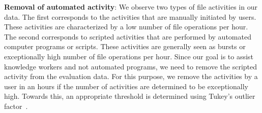 
\noindent\textbf{Removal of automated activity}: 
\label{sec:removebursts}
We observe two types of file activities in our data.  The first
corresponds to the activities that are manually initiated by
users. These activities are characterized by a low number of file
operations per hour.  The second corresponds to scripted activities
that are performed by automated computer programs or scripts.  These
activities are generally seen as bursts or exceptionally high number
of file operations per hour.  Since our goal is to assist knowledge
workers and not automated programs, we need to remove the scripted
activity from the evaluation data.  For this purpose, we remove
the activities by a user in an hours if the number of activities are 
determined to be exceptionally high. Towards this, an appropriate threshold 
is determined using Tukey's outlier
factor~\cite{wang2011statistical}.\linebreak

